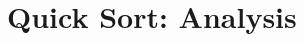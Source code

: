 \documentclass[14pt,aspectratio=1610]{beamer}
\begin{document}




\section{Quick Sort: Analysis}
\end{document}
